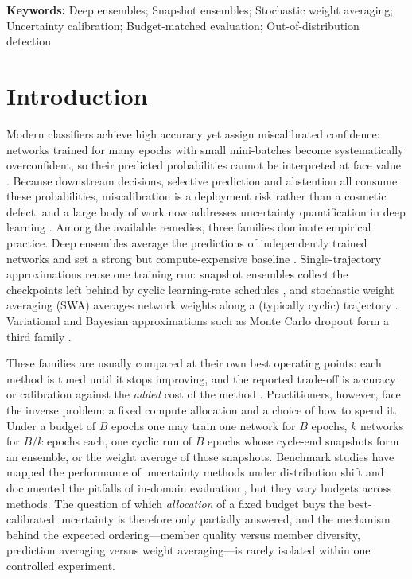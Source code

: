 \documentclass[11pt,a4paper]{article}
\newcommand{\swa}{\textsc{SWA}}
\begin{document}
\vspace{2pt}
\noindent\textbf{Keywords:} Deep ensembles; Snapshot ensembles; Stochastic
weight averaging; Uncertainty calibration; Budget-matched evaluation;
Out-of-distribution detection

\vspace{6pt}

\section{Introduction}\label{sec:intro}

Modern classifiers achieve high accuracy yet assign miscalibrated
confidence: networks trained for many epochs with small mini-batches become
systematically overconfident, so their predicted probabilities cannot be
interpreted at face value
\citep{guo2017,abdar2021}. Because downstream decisions, selective
prediction and abstention all consume these probabilities, miscalibration
is a deployment risk rather than a cosmetic defect, and a large body of work
now addresses uncertainty quantification in deep learning
\citep{abdar2021,ovadia2019}. Among the available remedies, three families
dominate empirical practice. Deep ensembles average the predictions of
independently trained networks and set a strong but compute-expensive
baseline \citep{lakshminarayanan2017,fort2019}. Single-trajectory
approximations reuse one training run: snapshot ensembles collect the
checkpoints left behind by cyclic learning-rate schedules
\citep{huang2017,loshchilov2017}, and stochastic weight averaging (\swa)
averages network weights along a (typically cyclic) trajectory
\citep{izmailov2018,wilson2020,maddox2019}. Variational and Bayesian
approximations such as Monte Carlo dropout form a third family
\citep{gal2016,welling2011}.

These families are usually compared at their own best operating points:
each method is tuned until it stops improving, and the reported trade-off is
accuracy or calibration against the \emph{added} cost of the method
\citep{ashukha2020}. Practitioners, however, face the inverse problem: a
fixed compute allocation and a choice of how to spend it. Under a budget of
$B$ epochs one may train one network for $B$ epochs, $k$ networks for
$B/k$ epochs each, one cyclic run of $B$ epochs whose cycle-end snapshots
form an ensemble, or the weight average of those snapshots. Benchmark
studies have mapped the performance of uncertainty methods under
distribution shift and documented the pitfalls of in-domain evaluation
\citep{ovadia2019,ashukha2020}, but they vary budgets across methods. The
question of which \emph{allocation} of a fixed budget buys the
best-calibrated uncertainty is therefore only partially answered, and the
mechanism behind the expected ordering---member quality versus member
diversity, prediction averaging versus weight averaging---is rarely
isolated within one controlled experiment.
\end{document}
